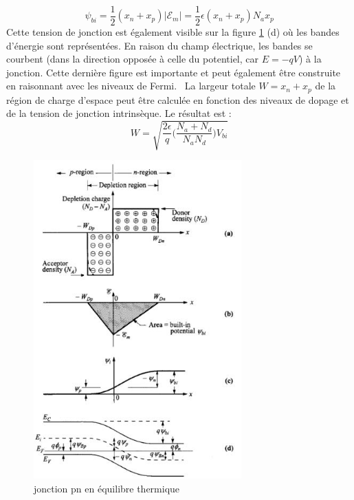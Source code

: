 $$
\psi_{bi} = \frac{1}{2} (x_n + x_p) |\mathcal{E}_m| = \frac{1}{2} \epsilon (x_n + x_p)  N_a x_p
$$
Cette tension de jonction est également visible sur la figure \ref{fig:pn_equilibrium} (d) où les bandes d'énergie sont représentées. En raison du champ électrique, les bandes se courbent (dans la direction opposée à celle du potentiel, car $E=-qV$) à la jonction. Cette dernière figure est importante et peut également être construite en raisonnant avec les niveaux de Fermi. \
La largeur totale $W = x_n + x_p$ de la région de charge d'espace peut être calculée en fonction des niveaux de dopage et de la tension de jonction intrinsèque. Le résultat est :
\begin{equation}
    W = \sqrt{\frac{2 \epsilon}{q} \Big(\frac{N_a + N_d}{N_a N_d}\Big) V_{bi}}
    \label{eq:SCR_width}
\end{equation}

\begin{figure}[h!]
	\centering
	\includegraphics[width=8cm]{figures/ch01/pn_equilibrium.jpg}
	\caption{jonction pn en équilibre thermique}
	\label{fig:pn_equilibrium}
\end{figure}
